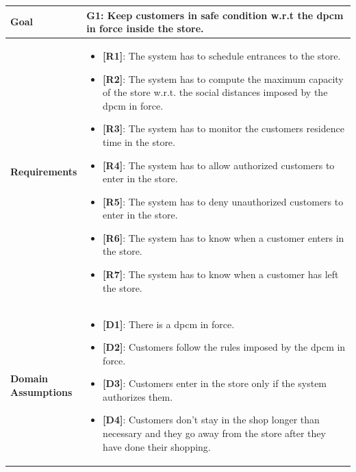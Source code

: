 \begin{table}[H]
\centering
\begin{tabular}{| m{} | m{} |} 
	\hline
	\textbf{Goal} &
		\textbf{G1: Keep customers in safe condition w.r.t the \gls{dpcm} in force inside the store.} \\
	\hline
	\textbf{Requirements} &
		\begin{itemize}
			\item {\textbf{[R1]}}: The system has to schedule entrances to the store.
			\item {\textbf{[R2]}}: The system has to compute the maximum capacity of the store w.r.t. the social distances imposed by the \gls{dpcm} in force.
			\item {\textbf{[R3]}}: The system has to monitor the customers residence time in the store.
			\item {\textbf{[R4]}}: The system has to allow authorized customers to enter in the store.
			\item {\textbf{[R5]}}: The system has to deny unauthorized customers to enter in the store.
			\item {\textbf{[R6]}}: The system has to know when a customer enters in the store.
			\item {\textbf{[R7]}}: The system has to know when a customer has left the store.
		\end{itemize} \\
	\hline
	\shortstack[l]{\textbf{Domain} \\ \textbf{Assumptions}} & 
		\begin{itemize}
			\item {\textbf{[D1]}}: There is a \gls{dpcm} in force.
			\item {\textbf{[D2]}}: Customers follow the rules imposed by the \gls{dpcm} in force.
			\item {\textbf{[D3]}}: Customers enter in the store only if the system authorizes them.
			\item {\textbf{[D4]}}: Customers don't stay in the shop longer than necessary and they go away from the store after they have done their shopping.
		\end{itemize} \\ 
	\hline
\end{tabular}
\end{table}

